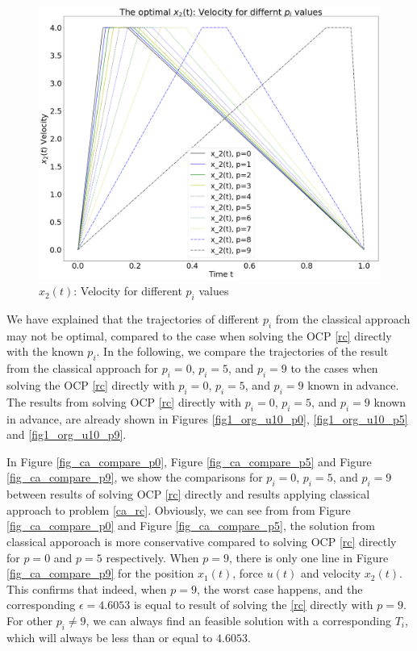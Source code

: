 \documentclass  [
  paper    = a4,
  BCOR     = 10mm,
  twoside,
  fontsize = 12pt,
  fleqn,
  toc      = bibnumbered,
  toc      = listofnumbered,
  numbers  = noendperiod,
  headings = normal,
  listof   = leveldown,
  version  = 3.03
]                                       {scrreprt}
\newcommand{\<}{\langle}
\renewcommand{\>}{\rangle}
\begin{document}
\begin{figure}[H]
	\centerline{\includegraphics[width=13cm]{ca_vt_pis.png}}
	\caption{$x_2(t)$: Velocity for different $p_i$ values}
	\label{fig_ca_vt_pis}
\end{figure}


We have explained that the trajectories of different $p_i$ from the classical approach may not be optimal, compared to the case when solving the OCP \ref{rc} directly with the known $p_i$. In the following, we compare the trajectories of the result from the classical approach for $p_i=0$, $p_i=5$, and $p_i=9$ to the cases when solving the OCP \ref{rc} directly with $p_i=0$, $p_i=5$, and $p_i=9$ known in advance. The results from solving OCP \ref{rc} directly with $p_i=0$, $p_i=5$, and $p_i=9$ known in advance, are already shown in Figures \ref{fig1_org_u10_p0},  \ref{fig1_org_u10_p5} and \ref{fig1_org_u10_p9}. 

In Figure \ref{fig_ca_compare_p0}, Figure \ref{fig_ca_compare_p5} and Figure \ref{fig_ca_compare_p9}, we show the comparisons for $p_i=0$, $p_i=5$, and $p_i=9$ between results of solving OCP \ref{rc} directly and results applying classical approach to problem \ref{ca_rc}. Obviously, we can see from from Figure \ref{fig_ca_compare_p0} and Figure \ref{fig_ca_compare_p5}, the solution from classical apporoach is more conservative compared to solving OCP \ref{rc} directly for $p=0$ and $p=5$ respectively. When $p=9$, there is only one line in Figure \ref{fig_ca_compare_p9} for the position $x_1(t)$, force $u(t)$ and velocity $x_2(t)$. This confirms that indeed, when $p=9$, the worst case happens, and the corresponding $\epsilon=4.6053$ is equal to result of solving the \ref{rc} directly with $p=9$. For other $p_i \neq 9$, we can always find an feasible solution with a corresponding $T_i$, which will always be less than or equal to $4.6053$. 
\end{document}
